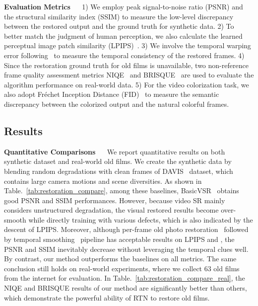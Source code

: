 \documentclass[10pt,twocolumn,letterpaper]{article}
\begin{document}
	\noindent\textbf{Evaluation Metrics} ~~ 1) We employ peak signal-to-noise ratio (PSNR) and the structural similarity index (SSIM) to measure the low-level discrepancy between the restored output and the ground truth for synthetic data. 2) To better match the judgment of human perception, we also calculate the learned perceptual image patch similarity (LPIPS)~\cite{zhang2018perceptual}. 3) 
	We involve the temporal warping error  following~\cite{chen2017coherent,lai2018learning} to measure the temporal consistency of the restored frames. 4) Since the restoration ground truth for old films is unavailable, two non-reference frame quality assessment metrics NIQE~\cite{NIQE} and BRISQUE~\cite{BRISQUE} are used to evaluate the algorithm performance on real-world data. 5) For the video colorization task, we also adopt Fr\'echet Inception Distance (FID)~\cite{FID} to measure the semantic discrepancy between the colorized output and the natural colorful frames. 


	
	
	
	
	\subsection{Results}
	\noindent\textbf{Quantitative Comparisons} ~~ We report quantitative results on both synthetic dataset and real-world old films. We create the synthetic data by blending random degradations with clean frames of DAVIS~\cite{pont20172017} dataset, which contains large camera motions and scene diversities. As shown in Table.~\ref{tab:restoration_compare}, among these baselines, BasicVSR~\cite{chan2021basicvsr} obtains good PSNR and SSIM performances. However, because video 
	SR mainly considers unstructured degradation, the visual restored results become over-smooth while directly training with various defects, which is also indicated by the descent of LPIPS. Moreover, although per-frame old photo restoration~\cite{wan2020bringing} followed by temporal smoothing~\cite{lai2018learning} pipeline has acceptable results on LPIPS and , the PSNR and SSIM inevitably decrease without leveraging the temporal clues well. By contrast, our method outperforms the baselines on all metrics. The same conclusion still holds on real-world experiments, where we collect 63 old films from the internet for evaluation. In Table.~\ref{tab:restoration_compare_real}, the NIQE and BRISQUE results of our method are significantly better than others, which demonstrate the powerful ability of RTN to restore old films.
	
\end{document}
